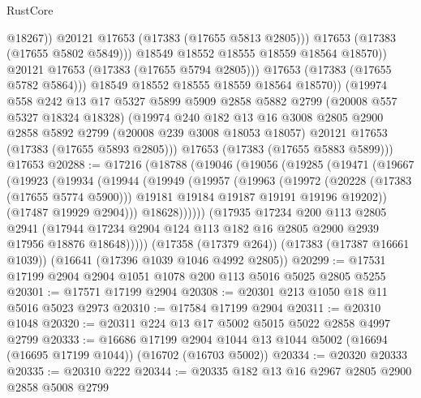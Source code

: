 \begin{lexlean}{RustCore}
\begin{coremodule}
                        @18267))
                    @20121
                    @17653
                    (@17383 (@17655 @5813 @2805)))
                  @17653
                  (@17383 (@17655 @5802 @5849)))
                @18549
                @18552
                @18555
                @18559
                @18564
                @18570))
            @20121
            @17653
            (@17383 (@17655 @5794 @2805)))
          @17653
          (@17383 (@17655 @5782 @5864)))
        @18549
        @18552
        @18555
        @18559
        @18564
        @18570))
    (@19974
      @558
      @242
      @13
      @17
      @5327
      @5899
      @5909
      @2858
      @5882
      @2799
      (@20008 @557 @5327 @18324 @18328)
      (@19974
        @240
        @182
        @13
        @16
        @3008
        @2805
        @2900
        @2858
        @5892
        @2799
        (@20008 @239 @3008 @18053 @18057)
        @20121
        @17653
        (@17383 (@17655 @5893 @2805)))
      @17653
      (@17383 (@17655 @5883 @5899)))
    @17653
@20288 := @17216
    (@18788
      (@19046
        (@19056
          (@19285
            (@19471
              (@19667
                (@19923
                  (@19934
                    (@19944
                      (@19949
                        (@19957
                          (@19963
                            (@19972
                              (@20228 (@17383 (@17655 @5774 @5900)))
                              @19181
                              @19184
                              @19187
                              @19191
                              @19196
                              @19202))
                          (@17487 @19929 @2904)))
                      @18628))))))
          (@17935
            @17234
            @200
            @113
            @2805
            @2941
            (@17944 @17234 @2904 @124 @113 @182 @16 @2805 @2900 @2939 @17956 @18876 @18648)))))
    (@17358 (@17379 @264))
    (@17383 (@17387 @16661 @1039))
    (@16641 (@17396 @1039 @1046 @4992 @2805))
@20299 := @17531 @17199 @2904 @2904 @1051 @1078 @200 @113 @5016 @5025 @2805 @5255
@20301 := @17571 @17199 @2904
@20308 := @20301 @213 @1050 @18 @11 @5016 @5023 @2973
@20310 := @17584 @17199 @2904
@20311 := @20310 @1048
@20320 := @20311 @224 @13 @17 @5002 @5015 @5022 @2858 @4997 @2799
@20333 := @16686
    @17199
    @2904
    @1044
    @13
    @1044
    @5002
    (@16694 (@16695 @17199 @1044))
    (@16702 (@16703 @5002))
@20334 := @20320 @20333
@20335 := @20310 @222
@20344 := @20335 @182 @13 @16 @2967 @2805 @2900 @2858 @5008 @2799

\end{coremodule}
\end{lexlean}
